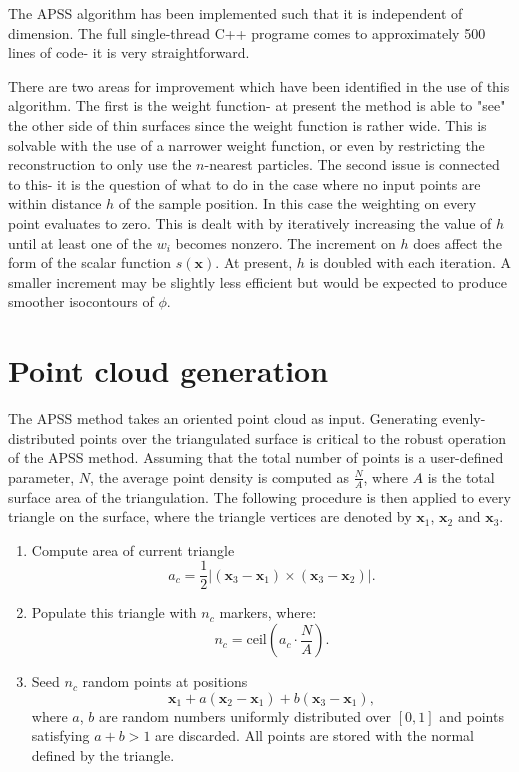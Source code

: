 \documentclass[final,3p,times,twocolumn]{elsarticle}
\begin{document}
The APSS algorithm has been implemented such that it is independent of dimension. The full single-thread C++ programe comes to approximately 500 lines of code- it is very straightforward.
\par
There are two areas for improvement which have been identified in the use of this algorithm.
The first is the weight function- at present the method is able to "see" the other side of thin
surfaces since the weight function is rather wide. This is solvable with the use of a narrower
weight function, or even by restricting the reconstruction to only use the $n$-nearest particles.
The second issue is connected to this- it is the question of what to do in the case where no input points are within distance $h$ of the
sample position. In this case the weighting on every point evaluates to zero. This is dealt with by iteratively increasing
the value of $h$ until at least one of the $w_i$ becomes nonzero. The increment on $h$ does affect the form of the scalar function
$s(\textbf{x})$. At present, $h$ is doubled with each iteration. A smaller increment may be slightly
less efficient but would be expected to produce smoother isocontours of $\phi$.




\section{Point cloud generation}

The APSS method takes an oriented point cloud as input. Generating evenly-distributed points
over the triangulated surface is critical to the robust operation of the APSS method.
Assuming that the total number of points is a user-defined parameter, $N$, the average point
density is computed as $\frac{N}{A}$, where $A$ is the total surface area of the triangulation.
The following procedure is then applied to every triangle on the surface, where the triangle
vertices are denoted by $\textbf{x}_1$, $\textbf{x}_2$ and $\textbf{x}_3$.
\begin{enumerate}
\item Compute area of current triangle
\begin{equation}
a_c = \frac{1}{2} |(\textbf{x}_3 - \textbf{x}_1) \times (\textbf{x}_3 - \textbf{x}_2)|.
\end{equation}
\item Populate this triangle with $n_c$ markers, where:
\begin{equation}
n_c = \mathrm{ceil}\left(a_c \cdot \frac{N}{A}\right).
\end{equation}
\item Seed $n_c$ random points at positions
\begin{equation}
\textbf{x}_1 + a (\textbf{x}_2 - \textbf{x}_1) + b (\textbf{x}_3 - \textbf{x}_1),
\end{equation}
where $a$, $b$ are random numbers uniformly distributed over $[0,1]$ and points 
satisfying $a+b > 1$ are discarded. All points are stored with the normal defined by
the triangle.
\end{enumerate}
\end{document}
